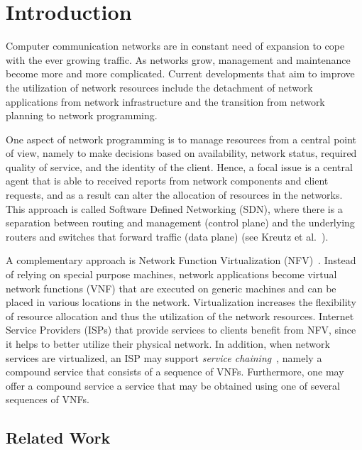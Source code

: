 \section{Introduction}

Computer communication networks are in constant need of expansion to
cope with the ever growing traffic.  As networks grow, management and
maintenance become more and more complicated.
%
Current developments that aim to improve the utilization of network
resources include the detachment of network applications from network
infrastructure and the transition from network planning to network
programming.

One aspect of network programming is to manage resources from a
central point of view, namely to make decisions based on availability,
network status, required quality of service, and the identity of the
client.  Hence, a focal issue is a central agent that is able to
received reports from network components and client requests, and as a
result can alter the allocation of resources in the networks.  This
approach is called Software Defined Networking (SDN), where there is a
separation between routing and management (control plane) and the
underlying routers and switches that forward traffic (data plane) (see
Kreutz et al.~\cite{KRVRAU15}).

A complementary approach is Network Function Virtualization
(NFV)~\cite{NFV12}.  Instead of relying on special purpose machines,
network applications become virtual network functions (VNF) that are
executed on generic machines and can be placed in various locations in
the network.  Virtualization increases the flexibility of resource
allocation and thus the utilization of the network resources.
%
Internet Service Providers (ISPs) that provide services to clients
benefit from NFV, since it helps to better utilize their physical
network.  In addition, when network services are virtualized, an ISP
may support \emph{service chaining}~\cite{ServiceChaining15}, namely a
compound service that consists of a sequence of VNFs.  Furthermore,
one may offer a compound service a service that may be obtained using
one of several sequences of VNFs.


\subsection{Related Work}

